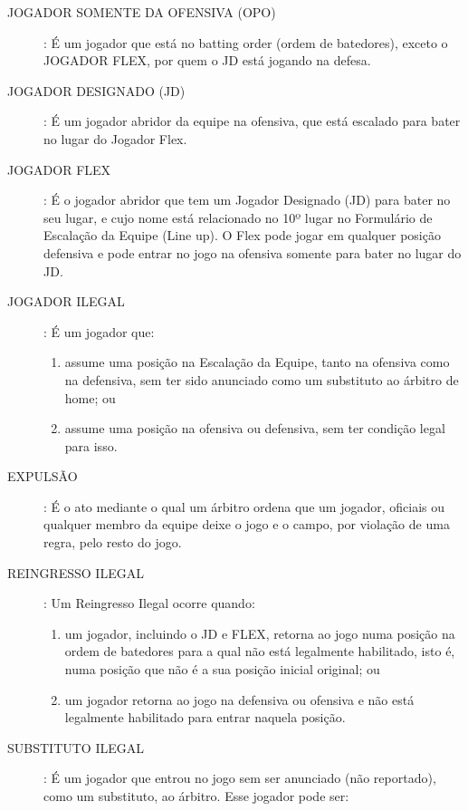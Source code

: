 \begin{description}	
	\item[JOGADOR SOMENTE DA OFENSIVA (OPO)]: \'E um jogador que est\'a no \gls{batting order} (ordem de batedores), exceto o JOGADOR FLEX, por quem o JD est\'a jogando na defesa. 
	\item[JOGADOR DESIGNADO (JD)]: \'E um jogador abridor da equipe na ofensiva, que est\'a escalado para bater no lugar do Jogador Flex. 
	
	\item[JOGADOR FLEX]: \'E o jogador abridor que tem um Jogador Designado (JD) para bater no seu lugar, e cujo nome est\'a relacionado no 10º lugar no Formul\'ario de Escala\c{c}\~ao da Equipe (Line up). O Flex pode jogar em qualquer posi\c{c}\~ao defensiva e pode entrar no jogo na ofensiva somente para bater no lugar do JD. 

	\item[JOGADOR ILEGAL]: \'E um jogador que: 
	
	\begin{enumerate}[label=\alph*)]
		\item assume uma posi\c{c}\~ao na Escala\c{c}\~ao da Equipe, tanto na ofensiva como na defensiva, sem ter sido anunciado como um substituto ao \'arbitro de \gls{home}; ou
		\item assume uma posi\c{c}\~ao na ofensiva ou defensiva, sem ter condi\c{c}\~ao legal para isso. 
	\end{enumerate}

	\item[EXPULSÃO]: \'E o ato mediante o qual um \'arbitro ordena que um jogador, oficiais ou qualquer membro da equipe deixe o jogo e o campo, por viola\c{c}\~ao de uma regra, pelo resto do jogo. 
	\item[REINGRESSO ILEGAL]: Um Reingresso Ilegal ocorre quando: 
	
	\begin{enumerate}[label=\alph*)]
		\item um jogador, incluindo o JD e FLEX, retorna ao jogo numa posi\c{c}\~ao na ordem de batedores para a qual n\~ao est\'a legalmente habilitado, isto \'e, numa posi\c{c}\~ao que n\~ao \'e a sua posi\c{c}\~ao inicial original; ou 
		
		\item  um jogador retorna ao jogo na defensiva ou ofensiva e n\~ao est\'a legalmente habilitado para entrar naquela posi\c{c}\~ao. 
	\end{enumerate}
	\item[SUBSTITUTO ILEGAL]: \'E um jogador que entrou no jogo sem ser anunciado (n\~ao reportado), como um substituto, ao \'arbitro. Esse jogador pode ser: 
	

\end{description}

